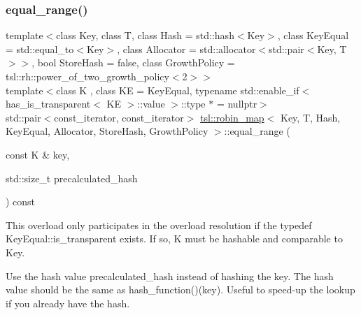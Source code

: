 \subsubsection{\texorpdfstring{equal\_range()}{equal\_range()}\hspace{0.1cm}{\footnotesize\ttfamily [6/6]}}
{\footnotesize\ttfamily template$<$class Key, class T, class Hash = std\+::hash$<$\+Key$>$, class Key\+Equal = std\+::equal\+\_\+to$<$\+Key$>$, class Allocator = std\+::allocator$<$std\+::pair$<$\+Key, T$>$$>$, bool Store\+Hash = false, class Growth\+Policy = tsl\+::rh\+::power\+\_\+of\+\_\+two\+\_\+growth\+\_\+policy$<$2$>$$>$ \\
template$<$class K , class KE  = Key\+Equal, typename std\+::enable\+\_\+if$<$ has\+\_\+is\+\_\+transparent$<$ K\+E $>$\+::value $>$\+::type $\ast$  = nullptr$>$ \\
std\+::pair$<$const\+\_\+iterator, const\+\_\+iterator$>$ \mbox{\hyperlink{classtsl_1_1robin__map}{tsl\+::robin\+\_\+map}}$<$ Key, T, Hash, Key\+Equal, Allocator, Store\+Hash, Growth\+Policy $>$\+::equal\+\_\+range (\begin{DoxyParamCaption}\item[{const K \&}]{key,  }\item[{std\+::size\+\_\+t}]{precalculated\+\_\+hash }\end{DoxyParamCaption}) const\hspace{0.3cm}{\ttfamily [inline]}}





This overload only participates in the overload resolution if the typedef Key\+Equal\+::is\+\_\+transparent exists. If so, K must be hashable and comparable to Key.

Use the hash value \textquotesingle{}precalculated\+\_\+hash\textquotesingle{} instead of hashing the key. The hash value should be the same as hash\+\_\+function()(key). Useful to speed-\/up the lookup if you already have the hash. \mbox{\label{classtsl_1_1robin__map_a5de84ecb7e8d4704ec9e5b2e7c8f5a88}} 

